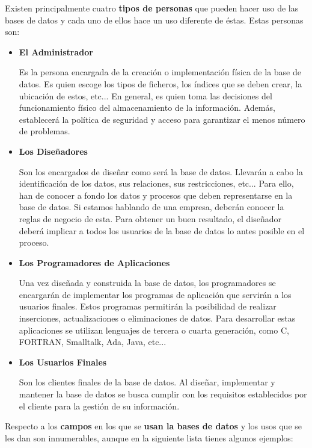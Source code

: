 Existen principalmente cuatro \textbf{tipos de personas} que pueden hacer uso de las bases de datos y cada uno de ellos hace un uso diferente de éstas. Estas personas son:

\begin{itemize}
    \item \textbf{El Administrador}

    Es la persona encargada de la creación o implementación física de la base de datos. Es quien escoge los tipos de ficheros, los índices que se deben crear, la ubicación de estos, etc... En general, es quien toma las decisiones del funcionamiento físico del almacenamiento de la información. Además, establecerá la política de seguridad y acceso para garantizar el menos número de problemas.

    \item \textbf{Los Diseñadores}

    Son los encargados de diseñar como será la base de datos. Llevarán a cabo la identificación de los datos, sus relaciones, sus restricciones, etc... Para ello, han de conocer a fondo los datos y procesos que deben representarse en la base de datos. Si estamos hablando de una empresa, deberán conocer la reglas de negocio de esta. Para obtener un buen resultado, el diseñador deberá implicar a todos los usuarios de la base de datos lo antes posible en el proceso.

    \item \textbf{Los Programadores de Aplicaciones}

    Una vez diseñada y construida la base de datos, los programadores se encargarán de implementar los programas de aplicación que servirán a los usuarios finales. Estos programas permitirán la posibilidad de realizar inserciones, actualizaciones o eliminaciones de datos. Para desarrollar estas aplicaciones se utilizan lenguajes de tercera o cuarta generación, como C, FORTRAN, Smalltalk, Ada, Java, etc...

    \newpage

    \item \textbf{Los Usuarios Finales}

    Son los clientes finales de la base de datos. Al diseñar, implementar y mantener la base de datos se busca cumplir con los requisitos establecidos por el cliente para la gestión de su información.
\end{itemize}


Respecto a los \textbf{campos} en los que se\textbf{ usan la bases de datos} y los usos que se les dan son innumerables, aunque en la siguiente lista tienes algunos ejemplos:

